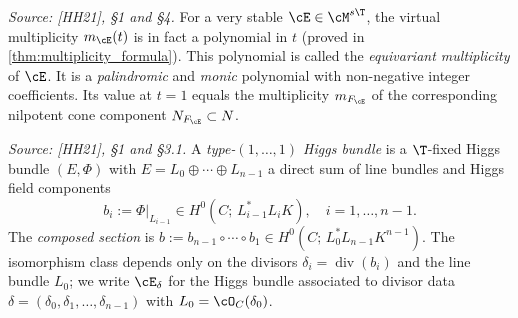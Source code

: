 \begin{definition}
  \label{def:equivariant_multiplicity}
  \textit{Source: [HH21], §1 and §4.}
  For a very stable \(\cE \in \cM^{s\T}\), the virtual multiplicity \(m_{\cE}(t)\) is in fact a
  polynomial in \(t\) (proved in \cref{thm:multiplicity_formula}).  This polynomial is called the
  \emph{equivariant multiplicity} of \(\cE\).  It is a \emph{palindromic} and \emph{monic}
  polynomial with non-negative integer coefficients.  Its value at \(t = 1\) equals the
  multiplicity \(m_{F_{\cE}}\) of the corresponding nilpotent cone component
  \(N_{F_{\cE}} \subset N\).
\end{definition}

\begin{definition}
  \label{def:type_one_one_bundle}
  \textit{Source: [HH21], §1 and §3.1.}
  A \emph{type-\((1,\ldots,1)\) Higgs bundle} is a \(\T\)-fixed Higgs bundle
  \((E, \Phi)\) with \(E = L_0 \oplus \cdots \oplus L_{n-1}\) a direct sum of line bundles and
  Higgs field components
  \[
    b_i := \Phi|_{L_{i-1}} \in H^0(C;\, L_{i-1}^* L_i K), \quad i = 1, \ldots, n-1.
  \]
  The \emph{composed section} is \(b := b_{n-1} \circ \cdots \circ b_1 \in H^0(C;\, L_0^* L_{n-1} K^{n-1})\).
  The isomorphism class depends only on the divisors \(\delta_i = \operatorname{div}(b_i)\) and
  the line bundle \(L_0\); we write \(\cE_\delta\) for the Higgs bundle associated to divisor
  data \(\delta = (\delta_0, \delta_1, \ldots, \delta_{n-1})\) with \(L_0 = \cO_C(\delta_0)\).
\end{definition}

